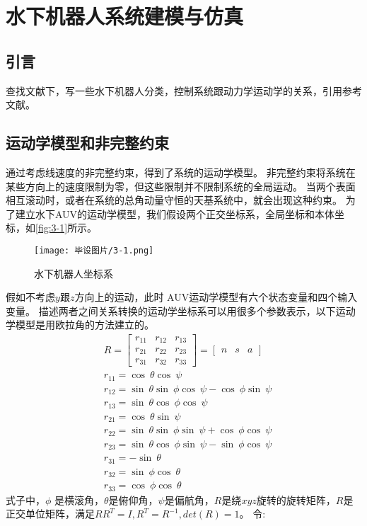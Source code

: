 \chapter{水下机器人系统建模与仿真}

\section{引言}
查找文献下，写一些水下机器人分类，控制系统跟动力学运动学的关系，引用参考文献。

\section{运动学模型和非完整约束}

通过考虑线速度的非完整约束，得到了系统的运动学模型\cite{ref20}。
非完整约束将系统在某些方向上的速度限制为零，但这些限制并不限制系统的全局运动\cite{ref19}。
当两个表面相互滚动时，或者在系统的总角动量守恒的天基系统中，就会出现这种约束\cite{ref29}。
为了建立水下AUV的运动学模型\cite{ref25}，我们假设两个正交坐标系，全局坐标和本体坐标，如\autoref{fig:3-1}所示。

\begin{figure}[htbp]
    \centering
    \texttt{[image: 毕设图片/3-1.png]}
    \caption{\label{fig:3-1}水下机器人坐标系}
\end{figure}
假如不考虑$y跟z$方向上的运动，此时
AUV运动学模型有六个状态变量和四个输入变量。
描述两者之间关系转换的运动学坐标系可以用很多个参数表示，以下运动学模型是用欧拉角的方法建立的\cite{ref21}。
\begin{equation}
    \begin{split}
        \label{equ:3-1}
    &R=\begin{bmatrix}r_{11}&r_{12}&r_{13}\\r_{21}&r_{22}&r_{23}\\r_{31}&r_{32}&r_{33}\end{bmatrix}=\begin{bmatrix}n&s&a\end{bmatrix}\\
    &r_{11}=\cos\:\theta\cos\:\psi\\
    &r_{12}=\sin\:\theta\sin\:\phi\cos\:\psi-\cos\:\phi\sin\:\psi\\
    &r_{13}=\sin\:\theta\cos\:\phi\cos\:\psi\\
    &r_{21}=\cos\:\theta\sin\:\psi\\
    &r_{22}=\sin\:\theta\sin\:\phi\sin\:\psi+\cos\:\phi\cos\:\psi\\
    &r_{23}=\sin\:\theta\cos\:\phi\sin\:\psi-\sin\:\phi\cos\:\psi\\
    &r_{31}=-\sin\:\theta\\
    &r_{32}=\sin\:\phi\cos\:\theta\\
    &r_{33}=\cos\:\phi\cos\:\theta
    \end{split}
\end{equation}
式子中，$\phi$ 是横滚角，$\theta $是俯仰角，$\psi $是偏航角，$R$是绕$xyz$旋转的旋转矩阵，$R$是正交单位矩阵，满足$RR^T = I, R^T = R^{-1},det(R) = 1$。
令:

